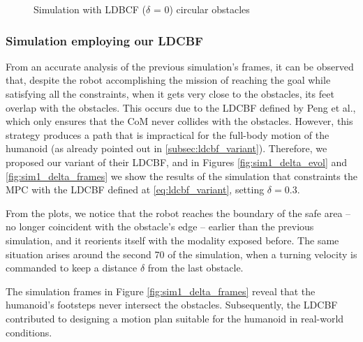 \begin{figure}[H]
\begin{subfigure}{0.35\textwidth}
    \end{subfigure}
    \caption[short]{Simulation with LDBCF ($\delta$ = 0) circular obstacles}
    \label{fig:sim1_frames}
\end{figure}

\subsubsection{Simulation employing our LDCBF}
From an accurate analysis of the previous simulation's frames, it can be observed that, despite the robot accomplishing the mission of reaching the goal while satisfying all the constraints, when it gets very close to the obstacles, its feet overlap with the obstacles. This occurs due to the LDCBF defined by Peng et al., which only ensures that the CoM never collides with the obstacles. However, this strategy produces a path that is impractical for the full-body motion of the humanoid (as already pointed out in \ref{subsec:ldcbf_variant}). Therefore, we proposed our variant of their LDCBF, and in Figures \ref{fig:sim1_delta_evol} and \ref{fig:sim1_delta_frames} we show the results of the simulation that constraints the MPC with the LDCBF defined at \ref{eq:ldcbf_variant}, setting $\delta=0.3$.

From the plots, we notice that the robot reaches the boundary of the safe area -- no longer coincident with the obstacle's edge -- earlier than the previous simulation, and it reorients itself with the modality exposed before. The same situation arises around the second 70 of the simulation, when a turning velocity is commanded to keep a distance $\delta$ from the last obstacle.

The simulation frames in Figure \ref{fig:sim1_delta_frames} reveal that the humanoid's footsteps never intersect the obstacles. Subsequently, the LDCBF contributed to designing a motion plan suitable for the humanoid in real-world conditions.

